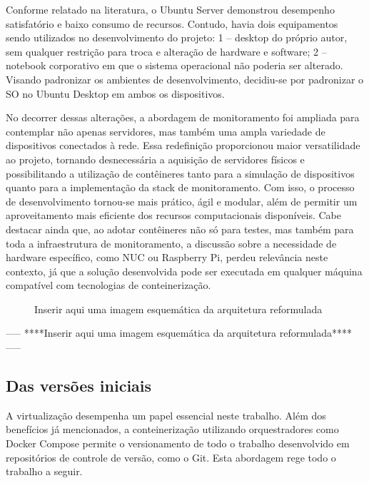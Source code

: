 Conforme relatado na literatura, o Ubuntu Server demonstrou desempenho satisfatório e baixo consumo de recursos. Contudo, havia dois equipamentos sendo utilizados no desenvolvimento do projeto: 1 -- desktop do próprio autor, sem qualquer restrição para troca e alteração de hardware e software; 2 -- notebook corporativo em que o sistema operacional não poderia ser alterado. Visando padronizar os ambientes de desenvolvimento, decidiu-se por padronizar o SO no Ubuntu Desktop em ambos os dispositivos.

No decorrer dessas alterações, a abordagem de monitoramento foi ampliada para contemplar não apenas servidores, mas também uma ampla variedade de dispositivos conectados à rede. Essa redefinição proporcionou maior versatilidade ao projeto, tornando desnecessária a aquisição de servidores físicos e possibilitando a utilização de contêineres tanto para a simulação de dispositivos quanto para a implementação da stack de monitoramento. Com isso, o processo de desenvolvimento tornou-se mais prático, ágil e modular, além de permitir um aproveitamento mais eficiente dos recursos computacionais disponíveis. Cabe destacar ainda que, ao adotar contêineres não só para testes, mas também para toda a infraestrutura de monitoramento, a discussão sobre a necessidade de hardware específico, como NUC ou Raspberry Pi, perdeu relevância neste contexto, já que a solução desenvolvida pode ser executada em qualquer máquina compatível com tecnologias de conteinerização.


\begin{figure}[H]
\centering
\fbox{\rule{0pt}{150pt} \rule{200pt}{0pt}} %
\caption{Inserir aqui uma imagem esquemática da arquitetura reformulada}
\label{fig:placeholder}
\end{figure}

-----
****Inserir aqui uma imagem esquemática da arquitetura reformulada****
-----


\subsection{Das versões iniciais}
\label{subsection:VersõesIniciais}

A virtualização desempenha um papel essencial neste trabalho. Além dos benefícios já mencionados, a conteinerização utilizando orquestradores como Docker Compose permite o versionamento de todo o trabalho desenvolvido em repositórios de controle de versão, como o Git. Esta abordagem rege todo o trabalho a seguir.

